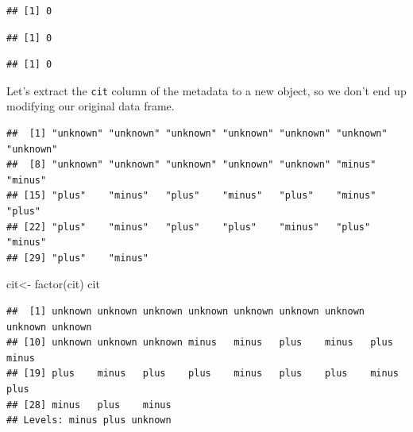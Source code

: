 \documentclass[
]{book}
\newenvironment{Shaded}{\begin{snugshade}}{\end{snugshade}}
\newcommand{\FunctionTok}[1]{\textcolor[rgb]{0.00,0.00,0.00}{#1}}
\newcommand{\NormalTok}[1]{#1}
\newcommand{\OtherTok}[1]{\textcolor[rgb]{0.56,0.35,0.01}{#1}}
\newcommand{\SpecialCharTok}[1]{\textcolor[rgb]{0.00,0.00,0.00}{#1}}
\begin{document}
\begin{verbatim}
## [1] 0
\end{verbatim}

\begin{Shaded}
\end{Shaded}

\begin{verbatim}
## [1] 0
\end{verbatim}

\begin{Shaded}
\end{Shaded}

\begin{verbatim}
## [1] 0
\end{verbatim}

Let's extract the \texttt{cit} column of the metadata to a new object, so we don't end up modifying our original data frame.

\begin{Shaded}
\end{Shaded}

\begin{verbatim}
##  [1] "unknown" "unknown" "unknown" "unknown" "unknown" "unknown" "unknown"
##  [8] "unknown" "unknown" "unknown" "unknown" "unknown" "minus"   "minus"  
## [15] "plus"    "minus"   "plus"    "minus"   "plus"    "minus"   "plus"   
## [22] "plus"    "minus"   "plus"    "plus"    "minus"   "plus"    "minus"  
## [29] "plus"    "minus"
\end{verbatim}

\begin{Shaded}
\begin{Highlighting}[]
\NormalTok{cit}\OtherTok{\textless{}{-}} \FunctionTok{factor}\NormalTok{(cit)}
\NormalTok{cit}
\end{Highlighting}
\end{Shaded}

\begin{verbatim}
##  [1] unknown unknown unknown unknown unknown unknown unknown unknown unknown
## [10] unknown unknown unknown minus   minus   plus    minus   plus    minus  
## [19] plus    minus   plus    plus    minus   plus    plus    minus   plus   
## [28] minus   plus    minus  
## Levels: minus plus unknown
\end{verbatim}
\end{document}
